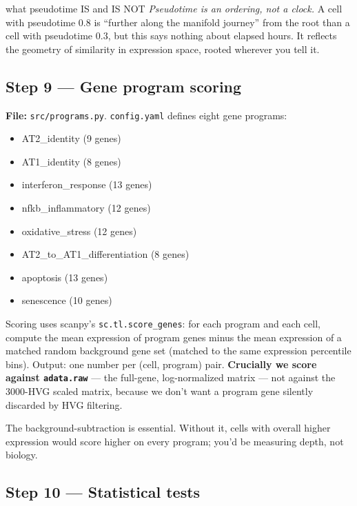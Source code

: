 \documentclass[11pt]{article}
\begin{document}
\begin{jargon}{what pseudotime IS and IS NOT}
\emph{Pseudotime is an ordering, not a clock.} A cell with pseudotime $0.8$
is ``further along the manifold journey'' from the root than a cell with
pseudotime $0.3$, but this says nothing about elapsed hours. It reflects
the geometry of similarity in expression space, rooted wherever you
tell it.
\end{jargon}

\subsection{Step 9 --- Gene program scoring}

\textbf{File:} \texttt{src/programs.py}. \texttt{config.yaml} defines eight
gene programs:
\begin{itemize}
\item AT2\_identity (9 genes)
\item AT1\_identity (8 genes)
\item interferon\_response (13 genes)
\item nfkb\_inflammatory (12 genes)
\item oxidative\_stress (12 genes)
\item AT2\_to\_AT1\_differentiation (8 genes)
\item apoptosis (13 genes)
\item senescence (10 genes)
\end{itemize}

Scoring uses scanpy's \texttt{sc.tl.score\_genes}: for each program and each
cell, compute the mean expression of program genes minus the mean expression
of a matched random background gene set (matched to the same expression
percentile bins). Output: one number per (cell, program) pair.
\textbf{Crucially we score against \texttt{adata.raw}} --- the full-gene,
log-normalized matrix --- not against the 3000-HVG scaled matrix, because we
don't want a program gene silently discarded by HVG filtering.

\begin{whyblock}
The background-subtraction is essential. Without it, cells with overall
higher expression would score higher on every program; you'd be measuring
depth, not biology.
\end{whyblock}

\subsection{Step 10 --- Statistical tests}
\end{document}
